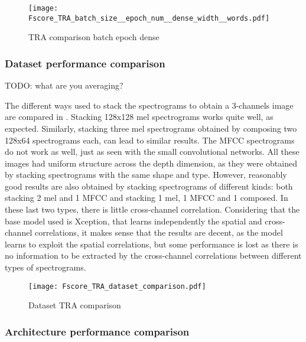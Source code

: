 
\begin{figure}[h!]
    \centering
    \texttt{[image: Fscore\_TRA\_batch\_size\_\_epoch\_num\_\_dense\_width\_\_words.pdf]}
    \caption{TRA comparison batch epoch dense}%
    \label{fig:tra_comparison_batch_epoch_dense}
\end{figure}

\subsubsection{Dataset performance comparison}


TODO: what are you averaging?

The different ways used to stack the spectrograms to obtain a 3-channels image
are compared in .
Stacking 128x128 mel spectrograms works quite well, as expected.
Similarly, stacking three mel spectrograms obtained by composing two 128x64
spectrograms each, can lead to similar results.
The MFCC spectrograms do not work as well, just as seen with the small
convolutional networks.
All these images had uniform structure across the depth dimension, as they were
obtained by stacking spectrograms with the same shape and type.
However, reasonably good results are also obtained by stacking spectrograms of
different kinds: both stacking 2 mel and 1 MFCC and stacking 1 mel, 1 MFCC and
1 composed.
In these last two types, there is little cross-channel correlation.
Considering that the base model used is Xception, that learns independently the
spatial and cross-channel correlations, it makes sense that the results are
decent, as the model learns to exploit the spatial correlations, but some
performance is lost as there is no information to be extracted by the
cross-channel correlations between different types of spectrograms.

\begin{figure}[h!]
    \centering
    \texttt{[image: Fscore\_TRA\_dataset\_comparison.pdf]}
    \caption{Dataset TRA comparison}%
    \label{fig:tra_comparison_dataset}
\end{figure}

\subsubsection{Architecture performance comparison}


